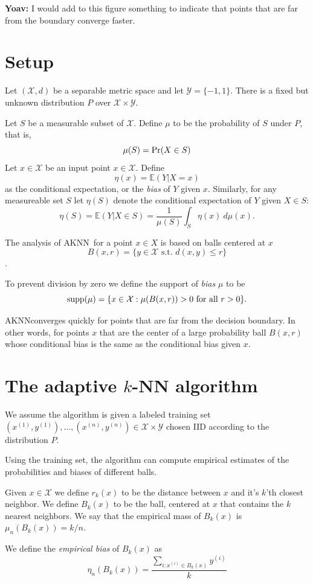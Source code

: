 \documentclass{article}
\def\pr{{\rm Pr}}
\def\E{{\mathbb E}}
\def\X{{\mathcal X}}
\def\Y{{\mathcal Y}}
\def\supp{{\rm supp}}
\newcommand{\algname}{\textsc{AKNN}}
\begin{document}
{\bf Yoav:} I would add to this figure something to indicate that
points that are far from the boundary converge faster.

\section{Setup}

Let $(\X, d)$ be a separable metric space and let $\Y =
\{-1,1\}$. There is a fixed but unknown distribution $P$ over $\X \times \Y$.

Let $S$ be a measurable subset of $\X$.
Define $\mu$ to be the probability of $S$ under $P$, that is,
$$ \mu(S) = \pr(X \in S) $$
Let $x \in \X$ be an input point $x \in \X$. Define 
$$ \eta(x) = \E(Y| X = x)$$ as the conditional expectation, or the
{\em bias}  of $Y$ given $x$.
Similarly, for any measureable set $S$ let $\eta(S)$ denote the
conditional expectation of $Y$ given $X \in S$:
$$ \eta(S) = \E(Y| X \in S) = \frac{1}{\mu(S)} \int_S \eta(x) \ d \mu(x) .$$

The analysis of \algname\ for a point $x \in X$ is based on balls centered
at $x$ $$ B(x,r) = \{ y \in \X \mbox{ s.t. } d(x,y) \leq r \} $$.

To prevent division by zero we define the support of {\em bias} $\mu$ to be
$$ \supp(\mu) = \{x \in \X: \mbox{$\mu(B(x,r)) > 0$ for all $r > 0$}\} .$$

\algname  converges quickly for points that are far
from the decision boundary. In other words, for points $x$ that are
the center of a large probability ball $B(x,r)$ whose conditional bias
is the same as the conditional bias given $x$.

\section{The adaptive $k$-NN algorithm}
We assume the algorithm is given a labeled training set
$(x^{(1)}, y^{(1)}), \ldots, (x^{(n)}, y^{(n)}) \in \X \times \Y$
chosen IID according to the distribution $P$.

Using the training set, the algorithm can compute empirical estimates of the
probabilities and biases of different balls.

Given $x \in \X$ we define $r_k(x)$ to be the distance between $x$ and
it's $k$'th closest neighbor. We define $B_k(x)$ to be the ball,
centered at $x$ that contains the $k$ nearest neighbors. We say that
the empirical mass of $B_k(x)$ is $\mu_n(B_k(x)) = k/n$.

We define the {\em empirical bias} of $B_k(x)$ as
\begin{equation}
  \eta_n(B_k(x))
  = \frac{\sum_{i:x^{(i)} \in B_k(x)} y^{(i)}}{k}
\label{eq:empirical-bias}
\end{equation}
\end{document}
